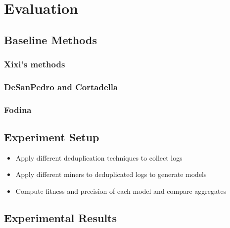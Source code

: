 \section{Evaluation}
\label{sec:evaluation}

\subsection{Baseline Methods}
\subsubsection{Xixi's methods}

\subsubsection{DeSanPedro and Cortadella}

\subsubsection{Fodina}


\subsection{Experiment Setup}

\begin{itemize}
	\item Apply different deduplication techniques to collect logs
	\item Apply different miners to deduplicated logs to generate models
	\item Compute fitness and precision of each model and compare aggregates
\end{itemize}

\subsection{Experimental Results}


